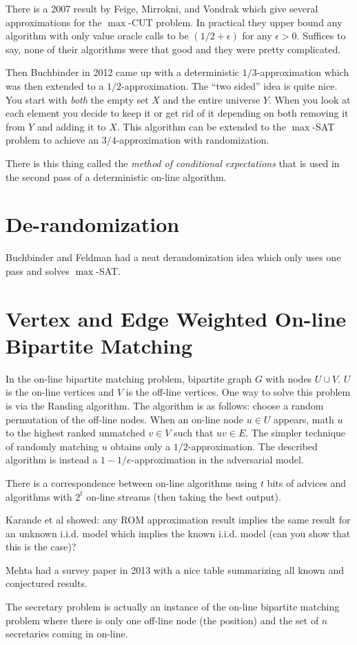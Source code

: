 \documentclass[twoside]{article}
\begin{document}
There is a 2007 result by Feige, Mirrokni, and Vondrak which give several approximations for the $\max$-CUT problem. In practical they upper bound any algorithm with only value oracle calls to be $(1/2 + \epsilon)$ for any $\epsilon > 0$. Suffices to say, none of their algorithms were that good and they were pretty complicated. 

Then Buchbinder in 2012 came up with a deterministic $1/3$-approximation which was then extended to a $1/2$-approximation. The ``two sided'' idea is quite nice. You start with \emph{both} the empty set $X$ and the entire universe $Y$. When you look at each element you decide to keep it or get rid of it depending on both removing it from $Y$ and adding it to $X$. This algorithm can be extended to the $\max$-SAT problem to achieve an $3/4$-approximation with randomization.

There is this thing called the \emph{method of conditional expectations} that is used in the second pass of a deterministic on-line algorithm.

\section{De-randomization}

Buchbinder and Feldman had a neat derandomization idea which only uses one pass and solves $\max$-SAT. 

\section{Vertex and Edge Weighted On-line Bipartite Matching}

In the on-line bipartite matching problem, bipartite graph $G$ with nodes $U \cup V$. $U$ is the on-line vertices and $V$ is the off-line vertices. One way to solve this problem is via the Randing algorithm. The algorithm is as follows: choose a random permutation of the off-line nodes. When an on-line node $u \in U$ appears, math $u$ to the highest ranked unmatched $v \in V$ such that $uv \in E$. The simpler technique of randomly matching $u$ obtains only a $1/2$-approximation. The described algorithm is instead a $1 - 1/e$-approximation in the adversarial model.

There is a correspondence between on-line algorithms using $t$ bits of advices and algorithms with $2^t$ on-line streams (then taking the best output). 

Karande et al showed: any ROM approximation result implies the same result for an unknown i.i.d. model which implies the known i.i.d. model (can you show that this is the case)?

Mehta had a survey paper in 2013 with a nice table summarizing all known and conjectured results. 

The secretary problem is actually an instance of the on-line bipartite matching problem where there is only one off-line node (the position) and the set of $n$ secretaries coming in on-line. 
\end{document}
